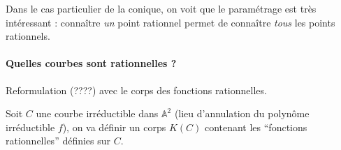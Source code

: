 \documentclass[a4paper, 11pt]{article}
\theoremstyle{definition}
\newcommand{\aff}{\mathbb{A}}
\begin{document}
Dans le cas particulier de la conique, on voit que le paramétrage est
très intéressant : connaître \emph{un} point rationnel permet de
connaître \emph{tous} les points rationnels.

\paragraph{Quelles courbes sont rationnelles ?} Reformulation (????)
avec le corps des fonctions rationnelles.

Soit $C$ une courbe irréductible dans $\aff^2$ (lieu d'annulation du
polynôme irréductible $f$), on va définir un corps $K(C)$ contenant
les \enquote{fonctions rationnelles} définies sur $C$.
\end{document}
